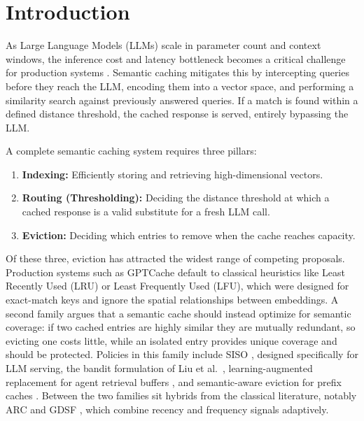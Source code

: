 \documentclass[sigconf,nonacm]{acmart}
\begin{document}
\maketitle

\section{Introduction}
As Large Language Models (LLMs) scale in parameter count and context windows, the inference cost and latency bottleneck becomes a critical challenge for production systems \cite{kwon2023pagedattention}. Semantic caching mitigates this by intercepting queries before they reach the LLM, encoding them into a vector space, and performing a similarity search against previously answered queries. If a match is found within a defined distance threshold, the cached response is served, entirely bypassing the LLM.

A complete semantic caching system requires three pillars:
\begin{enumerate}
\item \textbf{Indexing:} Efficiently storing and retrieving high-dimensional vectors.
\item \textbf{Routing (Thresholding):} Deciding the distance threshold at which a cached response is a valid substitute for a fresh LLM call.
\item \textbf{Eviction:} Deciding which entries to remove when the cache reaches capacity.
\end{enumerate}

Of these three, eviction has attracted the widest range of competing proposals. Production systems such as GPTCache \cite{bang2023gptcache} default to classical heuristics like Least Recently Used (LRU) or Least Frequently Used (LFU), which were designed for exact-match keys and ignore the spatial relationships between embeddings. A second family argues that a semantic cache should instead optimize for semantic coverage: if two cached entries are highly similar they are mutually redundant, so evicting one costs little, while an isolated entry provides unique coverage and should be protected. Policies in this family include SISO \cite{kim2025siso}, designed specifically for LLM serving, the bandit formulation of Liu et al.\ \cite{liu2026semantic}, learning-augmented replacement for agent retrieval buffers \cite{sun2026solar}, and semantic-aware eviction for prefix caches \cite{fang2026prefix}. Between the two families sit hybrids from the classical literature, notably ARC \cite{megiddo2003arc} and GDSF \cite{cherkasova1998gdsf}, which combine recency and frequency signals adaptively.
\end{document}

